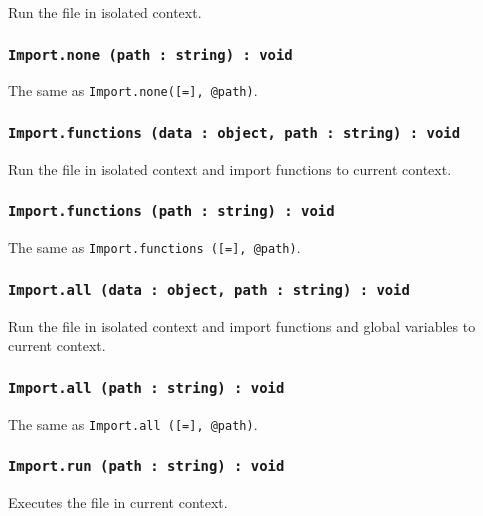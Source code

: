 Run the file in isolated context.

\subsubsection{\texttt{Import.none (path : string) : void}}

The same as \texttt{Import.none([=], @path)}.

\subsubsection{\texttt{Import.functions (data : object, path : string) : void}}

Run the file in isolated context and import functions to current context.

\subsubsection{\texttt{Import.functions (path : string) : void}}

The same as \texttt{Import.functions ([=], @path)}.

\subsubsection{\texttt{Import.all (data : object, path : string) : void}}

Run the file in isolated context and import functions and global variables to current context.

\subsubsection{\texttt{Import.all (path : string) : void}}

The same as \texttt{Import.all ([=], @path)}.

\subsubsection{\texttt{Import.run (path : string) : void}}

Executes the file in current context.
